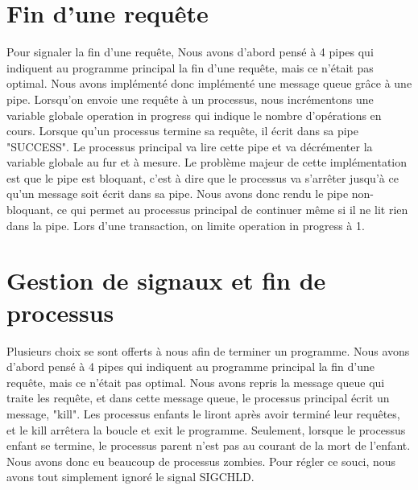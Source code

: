\documentclass[utf8]{article}
\begin{document}
\section{Fin d'une requête}

\indent{}
\par

Pour signaler la fin d'une requête, Nous avons d'abord pensé à 4 pipes qui indiquent au programme principal 
la fin d'une requête, mais ce n'était pas optimal. Nous avons implémenté donc implémenté une message queue grâce à une pipe. Lorsqu'on envoie 
une requête à un processus, nous incrémentons une variable globale operation in progress qui indique le nombre d'opérations en cours.
Lorsque qu'un processus termine sa requête, il écrit dans sa pipe "SUCCESS". Le processus principal va lire cette pipe et va décrémenter
la variable globale au fur et à mesure. Le problème majeur de cette implémentation est que le pipe est bloquant, c'est à dire que le processus
va s'arrêter jusqu'à ce qu'un message soit écrit dans sa pipe. Nous avons donc rendu le pipe non-bloquant, ce qui permet au processus principal de continuer
même si il ne lit rien dans la pipe. Lors d'une transaction, on limite operation in progress à 1.

\section{Gestion de signaux et fin de processus}
\indent{}
\par
Plusieurs choix se sont offerts à nous afin de terminer un programme. Nous avons d'abord pensé à 4 pipes qui indiquent au programme principal 
la fin d'une requête, mais ce n'était pas optimal.
Nous avons repris la message queue qui traite les requête, et dans 
cette message queue, le processus principal écrit un message, "kill". Les processus enfants le liront après avoir terminé leur requêtes,
et le kill arrêtera la boucle et exit le programme.
Seulement, lorsque le processus enfant se termine, le processus parent n'est pas au courant de la mort de l'enfant. Nous avons donc eu 
beaucoup de processus zombies. Pour régler ce souci, nous avons tout simplement ignoré le signal SIGCHLD.
\end{document}
